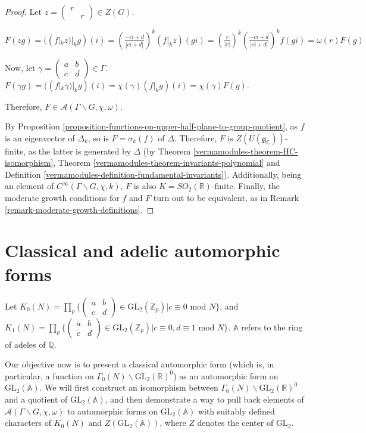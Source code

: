 \begin{proof}
Let $z = \begin{pmatrix} r &  \\ & r \end{pmatrix} \in Z(G)$.
	
$F(zg) = ((f|_k z)|_k g)(i) = (\frac{-ci + d}{|ci + d|})^{k}(f|_k z)(gi) 
	= (\frac{r}{|r|})^{k}(\frac{-ci + d}{|ci + d|})^{k}f(gi) = \omega(r) F(g)$
	
Now, let $\gamma = \begin{pmatrix}  a & b \\ c& d \end{pmatrix} \in \Gamma$.
	$F(\gamma g) = ((f|_k \gamma)|_k g)(i) = \chi(\gamma)(f|_k g)(i) = \chi(\gamma) F(g)$.

Therefore, $F \in \mathcal{A}(\Gamma \backslash G, \chi, \omega)$.

By Proposition \ref{proposition-functions-on-upper-half-plane-to-group-quotient}, as $f$ is an eigenvector of $\Delta_k$, so is $F = \sigma_{k}(f)$ of $\Delta$. Therefore, $F$ is $Z(U(\mathfrak{g}_\mathbb{C}))$-finite, as the latter is generated by $\Delta$ (by  Theorem \ref{vermamodules-theorem-HC-isomorphism}, Theorem \ref{vermamodules-theorem-invariants-polynomial} and Definition \ref{vermamodules-definition-fundamental-invariants}). Additionally, being an element of $C^{\infty}(\Gamma \backslash G, \chi, k)$, $F$ is also $K = SO_{2}(\mathbb{R})$-finite.
Finally, the moderate growth conditions for $f$ and $F$ turn out to be equivalent, as in Remark \ref{remark-moderate-growth-definitions}. 
\end{proof}

\section{Classical and adelic automorphic forms}
\label{section-classical-adelic-forms}
Let $K_{0}(N) = \prod_{p} \{ \begin{pmatrix}  a & b \\ c& d \end{pmatrix} \in \text{GL}_{2}(\mathbb{Z}_{p}) | c \equiv 0$  mod $N \}$, and $K_{1}(N) = \prod_{p} \{ \begin{pmatrix}  a & b \\ c& d \end{pmatrix} \in \text{GL}_{2}(\mathbb{Z}_{p}) | c \equiv 0, d \equiv 1$  mod $N \}$. $\mathbb{A}$ refers to the ring of adeles of $\mathbb{Q}$.


Our objective now is to present a classical automorphic form (which is, in particular, a function on $\Gamma_{0}(N) \backslash \text{GL}_{2}(\mathbb{R})^0$) as an automorphic form on $\text{GL}_2(\mathbb{A})$. We will first construct an isomorphism between $\Gamma_{0}(N) \backslash \text{GL}_{2}(\mathbb{R})^0$ and a quotient of $\text{GL}_2(\mathbb{A})$, and then demonstrate a way to pull back elements of $\mathcal{A}(\Gamma \backslash G, \chi, \omega)$ to automorphic forms on $\text{GL}_2(\mathbb{A})$ with suitably defined characters of $K_{0}(N)$ and $Z(\text{GL}_2(\mathbb{A}))$, where $Z$ denotes the center of $\text{GL}_2$.



